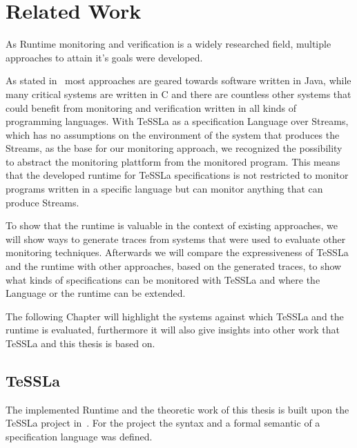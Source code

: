 %
\chapter{Related Work}
\label{sec:related}

As Runtime monitoring and verification is a widely researched field, multiple approaches to attain it's goals were developed.

As stated in~\cite{Havelund2008} most approaches are geared towards software written in Java, while many critical systems are written in C and there are countless other systems that could benefit from monitoring and verification written in all kinds of programming languages.
With TeSSLa as a specification Language over Streams, which has no assumptions on the environment of the system that produces the Streams,  as the base for our monitoring approach, we recognized the possibility to abstract the monitoring plattform from the monitored program.
This means that the developed runtime for TeSSLa specifications is not restricted to monitor programs written in a specific language but can monitor anything that can produce Streams.

To show that the runtime is valuable in the context of existing approaches, we will show ways to generate traces from systems that were used to evaluate other monitoring techniques.
Afterwards we will compare the expressiveness of TeSSLa and the runtime with other approaches, based on the generated traces, to show what kinds of specifications can be monitored with TeSSLa and where the Language or the runtime can be extended.

The following Chapter will highlight the systems against which TeSSLa and the runtime is evaluated, furthermore it will also give insights into other work that TeSSLa and this thesis is based on.

\section{TeSSLa}
\label{sec:related:tessla}

The implemented Runtime and the theoretic work of this thesis is built upon the TeSSLa project in~\cite{Decker2016}.
For the project the syntax and a formal semantic of a specification language was defined.

